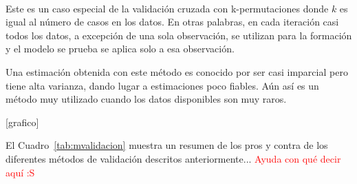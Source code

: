 \begin{description}
      [grafico]
      
      \item[Leave-One-Out Cross-Validation] \hfill \\
     Este es un caso especial de la validación cruzada con k-permutaciones donde $k$ es igual al número de casos en los datos. En otras palabras, en cada iteración casi todos los datos, a excepción de una sola observación, se utilizan para la formación y el modelo se prueba se aplica solo a esa observación. 
     
     Una estimación obtenida con este método es conocido por ser casi imparcial pero tiene alta varianza, dando lugar a estimaciones poco fiables. Aún así es un método muy utilizado cuando los datos disponibles son muy raros.
     
      [grafico]
    \end{description}

El Cuadro~\ref{tab:mvalidacion} muestra un resumen de los pros y contra de los diferentes métodos de validación descritos anteriormente... \textcolor{red}{Ayuda con qué decir aquí :S}

